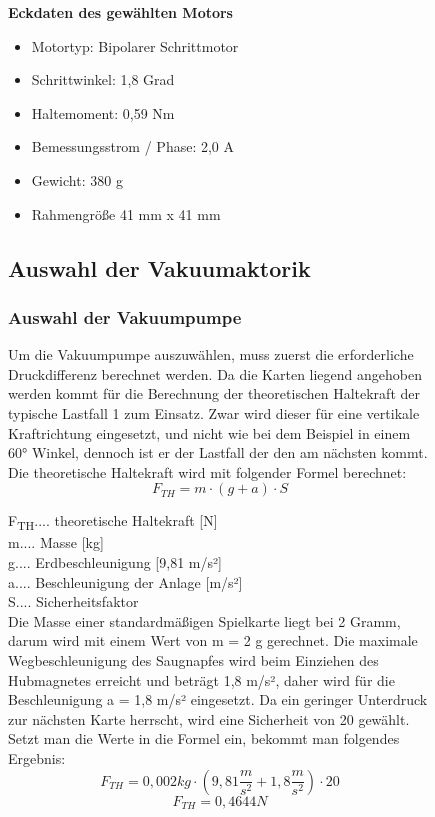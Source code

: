\begin{figure}
\textbf{Eckdaten des gewählten Motors}
\begin{itemize}
    \item Motortyp: Bipolarer Schrittmotor
    \item Schrittwinkel: 1,8 Grad
    \item Haltemoment: 0,59 Nm
    \item Bemessungsstrom / Phase: 2,0 A
    \item Gewicht: 380 g
    \item Rahmengröße 41 mm x 41 mm
\end{itemize}
\subsection{Auswahl der Vakuumaktorik}
\subsubsection{Auswahl der Vakuumpumpe}
Um die Vakuumpumpe auszuwählen, muss zuerst die erforderliche Druckdifferenz berechnet werden.
Da die Karten liegend angehoben werden kommt für die Berechnung der theoretischen Haltekraft der typische Lastfall 1
zum Einsatz. Zwar wird dieser für eine vertikale Kraftrichtung eingesetzt, und nicht wie bei dem Beispiel in einem
60° Winkel, dennoch ist er der Lastfall der den am nächsten kommt.
Die theoretische Haltekraft wird mit folgender Formel berechnet:
\begin{equation}
    F_{TH} = m \cdot (g + a) \cdot S
\end{equation}

    F\textsubscript{TH}.... theoretische Haltekraft [N] \\
    m.... Masse [kg]\\
    g.... Erdbeschleunigung [9,81 m/s²]\\
   a.... Beschleunigung der Anlage [m/s²]\\
    S.... Sicherheitsfaktor \\

Die Masse einer standardmäßigen  Spielkarte liegt bei 2 Gramm, darum wird mit einem Wert von m = 2 g gerechnet.
Die maximale Wegbeschleunigung des Saugnapfes wird beim Einziehen des Hubmagnetes erreicht und
beträgt 1,8 m/s²,
daher wird für die Beschleunigung a = 1,8 m/s² eingesetzt. Da ein geringer Unterdruck zur nächsten Karte herrscht, wird eine Sicherheit von 20 gewählt.
Setzt man die Werte in die Formel ein, bekommt man folgendes Ergebnis: \\
\[F_{TH}=0,002kg\cdot (9,81\frac{m}{s^{2}}+1,8\frac{m}{s^{2}})\cdot 20\]
\[F_{TH}= 0,4644N\]


\end{figure}

